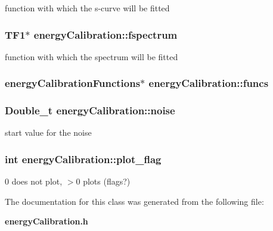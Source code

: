 function with which the s-curve will be fitted 
\subsubsection{\setlength{\rightskip}{0pt plus 5cm}TF1$\ast$ \bf{energy\-Calibration::fspectrum}\hspace{0.3cm}{\tt  [private]}}\label{classenergyCalibration_2ee734ab28b78dc5786a7ba430f8baa5}


function with which the spectrum will be fitted 
\subsubsection{\setlength{\rightskip}{0pt plus 5cm}\bf{energy\-Calibration\-Functions}$\ast$ \bf{energy\-Calibration::funcs}\hspace{0.3cm}{\tt  [private]}}\label{classenergyCalibration_e9b3307bf858331241871bde42fdd24e}


\subsubsection{\setlength{\rightskip}{0pt plus 5cm}Double\_\-t \bf{energy\-Calibration::noise}\hspace{0.3cm}{\tt  [private]}}\label{classenergyCalibration_4461206397e2442c92be9151ee231ec5}


start value for the noise 
\subsubsection{\setlength{\rightskip}{0pt plus 5cm}int \bf{energy\-Calibration::plot\_\-flag}\hspace{0.3cm}{\tt  [private]}}\label{classenergyCalibration_4edfb157df3624be677177dec0f9555b}


0 does not plot, $>$0 plots (flags?) 

The documentation for this class was generated from the following file:\begin{CompactItemize}
\item 
\bf{energy\-Calibration.h}\end{CompactItemize}
